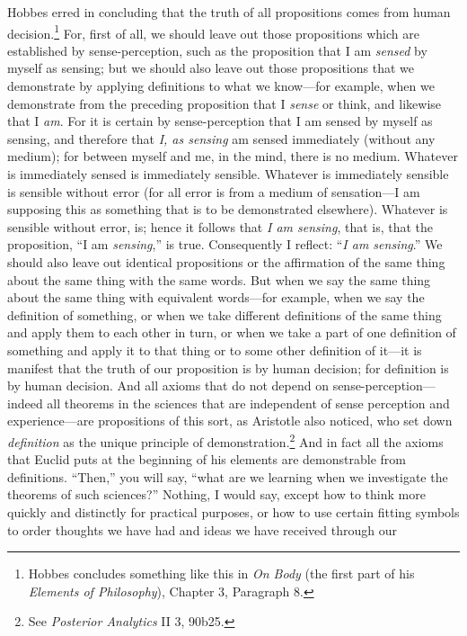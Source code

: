 \documentclass[polutonikogreek,english,twoside,openright]{article}
\begin{document}
Hobbes erred in concluding that the truth of all propositions comes from human
decision.\footnote{Hobbes concludes something like this in {\em On Body} (the first part of his {\em Elements of Philosophy}), Chapter 3, Paragraph 8. } For, first of all, we should leave out those propositions which are
established by sense-perception, such as the proposition that I am {\em
sensed} by myself as sensing; but we should also leave out those propositions
that we demonstrate by applying definitions to what we know---for example,
when we demonstrate from the preceding proposition that I {\em sense} or
think, and likewise that I {\em am}.  For it is certain by sense-perception
that I am sensed by myself as sensing, and therefore that {\em I, as sensing}
am sensed immediately (without any medium); for between myself and me, in the
mind, there is no medium.  Whatever is immediately sensed is immediately
sensible.  Whatever is immediately sensible is sensible without error (for all
error is from a medium of sensation---I am supposing this as something that
is to be demonstrated elsewhere).  Whatever is sensible without error, is;
hence it follows that {\em I am sensing}, that is, that the proposition, ``I
am {\em sensing},'' is true.  Consequently I reflect: ``{\em I am sensing}.''
We should also leave out identical propositions or the affirmation of the same
thing about the same thing with the same words. But when we say the same thing
about the same thing with equivalent words---for example, when we say the
definition of something, or when we take different definitions of the same
thing and apply them to each other in turn, or when we take a part of one
definition of something and apply it to that thing or to some other definition
of it---it is manifest that the truth of our proposition is by human
decision; for definition is by human decision.  And all axioms that do not
depend on sense-perception---indeed all theorems in the sciences that are
independent of sense perception and experience---are propositions of this
sort, as Aristotle also noticed, who set down {\em definition} as the unique
principle of demonstration.\footnote{See {\em Posterior Analytics} II 3, 90b25.}  And in fact all the axioms that Euclid puts at
the beginning of his elements are demonstrable from definitions.  ``Then,''
you will say, ``what are we learning when we investigate the theorems of such
sciences?''  Nothing, I would say, except how to think more quickly and
distinctly for practical purposes, or how to use certain fitting symbols to
order thoughts we have had and ideas we have received through our
\end{document}
